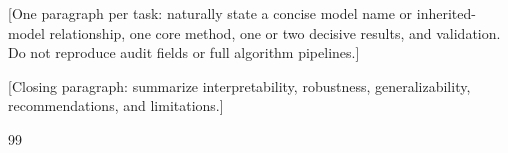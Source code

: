 \documentclass{mcmicm}
\begin{document}
\begin{summarysheet}

[One paragraph per task: naturally state a concise model name or inherited-model relationship, one core method, one or two decisive results, and validation. Do not reproduce audit fields or full algorithm pipelines.]

[Closing paragraph: summarize interpretability, robustness, generalizability, recommendations, and limitations.]
\end{summarysheet}









\begin{thebibliography}{99}
\end{thebibliography}
\appendix

\label{LastSolutionPage}
\clearpage

\end{document}
